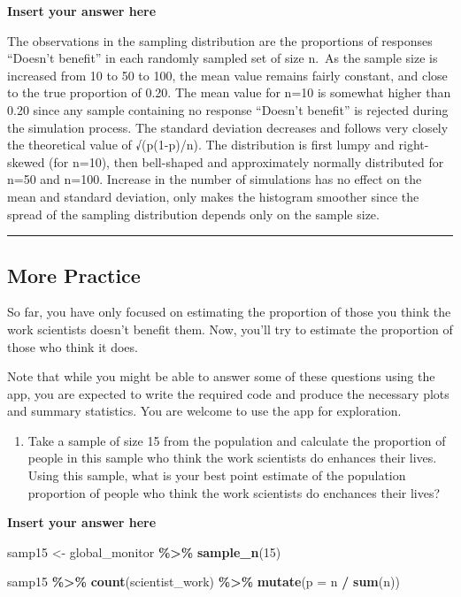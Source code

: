 \documentclass[
]{article}
\newenvironment{Shaded}{\begin{snugshade}}{\end{snugshade}}
\newcommand{\AttributeTok}[1]{\textcolor[rgb]{0.13,0.29,0.53}{#1}}
\newcommand{\DecValTok}[1]{\textcolor[rgb]{0.00,0.00,0.81}{#1}}
\newcommand{\FunctionTok}[1]{\textcolor[rgb]{0.13,0.29,0.53}{\textbf{#1}}}
\newcommand{\NormalTok}[1]{#1}
\newcommand{\OtherTok}[1]{\textcolor[rgb]{0.56,0.35,0.01}{#1}}
\newcommand{\SpecialCharTok}[1]{\textcolor[rgb]{0.81,0.36,0.00}{\textbf{#1}}}
\providecommand{\tightlist}{%
  \setlength{\itemsep}{0pt}\setlength{\parskip}{0pt}}
\begin{document}
\textbf{Insert your answer here}

The observations in the sampling distribution are the proportions of
responses ``Doesn't benefit'' in each randomly sampled set of size n.~As
the sample size is increased from 10 to 50 to 100, the mean value
remains fairly constant, and close to the true proportion of 0.20. The
mean value for n=10 is somewhat higher than 0.20 since any sample
containing no response ``Doesn't benefit'' is rejected during the
simulation process. The standard deviation decreases and follows very
closely the theoretical value of √(p(1-p)/n). The distribution is first
lumpy and right-skewed (for n=10), then bell-shaped and approximately
normally distributed for n=50 and n=100. Increase in the number of
simulations has no effect on the mean and standard deviation, only makes
the histogram smoother since the spread of the sampling distribution
depends only on the sample size.

\begin{center}\rule{0.5\linewidth}{0.5pt}\end{center}

\subsection{More Practice}\label{more-practice}

So far, you have only focused on estimating the proportion of those you
think the work scientists doesn't benefit them. Now, you'll try to
estimate the proportion of those who think it does.

Note that while you might be able to answer some of these questions
using the app, you are expected to write the required code and produce
the necessary plots and summary statistics. You are welcome to use the
app for exploration.

\begin{enumerate}
\def\labelenumi{\arabic{enumi}.}
\setcounter{enumi}{6}
\tightlist
\item
  Take a sample of size 15 from the population and calculate the
  proportion of people in this sample who think the work scientists do
  enhances their lives. Using this sample, what is your best point
  estimate of the population proportion of people who think the work
  scientists do enchances their lives?
\end{enumerate}

\textbf{Insert your answer here}

\begin{Shaded}
\begin{Highlighting}[]
\NormalTok{samp15 }\OtherTok{\textless{}{-}}\NormalTok{ global\_monitor }\SpecialCharTok{\%\textgreater{}\%}
  \FunctionTok{sample\_n}\NormalTok{(}\DecValTok{15}\NormalTok{)}

\NormalTok{samp15 }\SpecialCharTok{\%\textgreater{}\%}
  \FunctionTok{count}\NormalTok{(scientist\_work) }\SpecialCharTok{\%\textgreater{}\%}
  \FunctionTok{mutate}\NormalTok{(}\AttributeTok{p =}\NormalTok{ n }\SpecialCharTok{/} \FunctionTok{sum}\NormalTok{(n))}
\end{Highlighting}
\end{Shaded}
\end{document}
